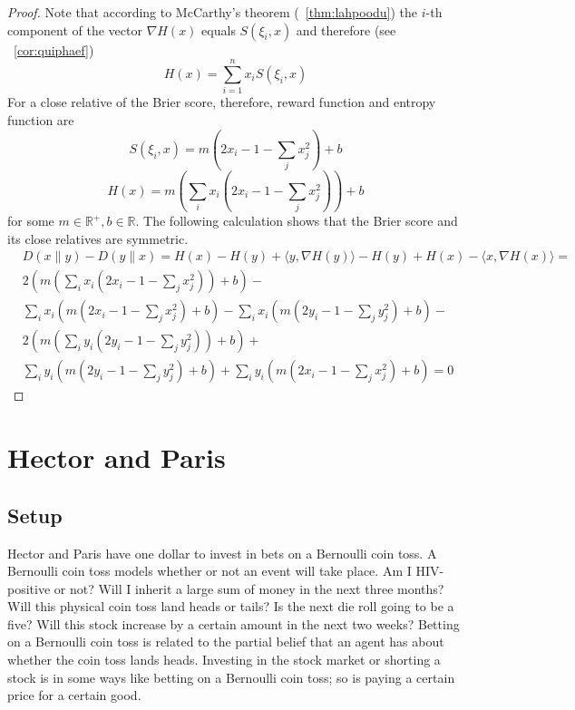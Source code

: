 \documentclass[12pt]{article}
\begin{document}
\begin{proof}
Note that according to McCarthy's theorem
({\heorem}~\ref{thm:lahpoodu}) the $i$-th component of the vector
$\nabla{}H(x)$ equals $S(\xi_{i},x)$ and therefore (see {\orollary}~\ref{cor:quiphaef})
\begin{equation}
  \label{eq:idiirioj}
  H(x)=\sum_{i=1}^{n}x_{i}S(\xi_{i},x)
\end{equation}
For a close relative of the Brier score, therefore, reward function
and entropy function are
\begin{equation}
  \label{eq:paegeina}
    S(\xi_{i},x)=m\left(2x_{i}-1-\sum_{j}x_{j}^{2}\right)+b
\end{equation}
\begin{equation}
  \label{eq:thughica}
    H(x)=m\left(\sum_{i}{}x_{i}\left(2x_{i}-1-\sum_{j}x_{j}^{2}\right)\right)+b
\end{equation}
for some $m\in\mathbb{R}^{+},b\in\mathbb{R}$. The following
calculation shows that the Brier score and its close relatives are
symmetric.
\begin{equation}
  \label{eq:uudeilah}
  \begin{split}
    & D(x\|y)-D(y\|x)=H(x)-H(y)+\langle{}y,\nabla{}H(y)\rangle-H(y)+H(x)-\langle{}x,\nabla{}H(x)\rangle= \\
    & 2\left(m\left(\sum_{i}{}x_{i}\left(2x_{i}-1-\sum_{j}x_{j}^{2}\right)\right)+b\right)- \\
    & \sum_{i}x_{i}\left(m\left(2x_{i}-1-\sum_{j}x_{j}^{2}\right)+b\right)-\sum_{i}x_{i}\left(m\left(2y_{i}-1-\sum_{j}y_{j}^{2}\right)+b\right)- \\
    & 2\left(m\left(\sum_{i}{}y_{i}\left(2y_{i}-1-\sum_{j}y_{j}^{2}\right)\right)+b\right)+ \\
    & \sum_{i}y_{i}\left(m\left(2y_{i}-1-\sum_{j}y_{j}^{2}\right)+b\right)+\sum_{i}y_{i}\left(m\left(2x_{i}-1-\sum_{j}x_{j}^{2}\right)+b\right)=0
  \end{split}
\end{equation}
\end{proof}

\section{Hector and Paris}
\label{section:shauboda}

\subsection{Setup}
\label{subsection:iewohgae}

Hector and Paris have one dollar to invest in bets on a Bernoulli coin
toss. A Bernoulli coin toss models whether or not an event will take
place. Am I HIV-positive or not? Will I inherit a large sum of money
in the next three months? Will this physical coin toss land heads or
tails? Is the next die roll going to be a five? Will this stock
increase by a certain amount in the next two weeks? Betting on a
Bernoulli coin toss is related to the partial belief that an agent has
about whether the coin toss lands heads. Investing in the stock market
or shorting a stock is in some ways like betting on a Bernoulli coin
toss; so is paying a certain price for a certain good. 
\end{document}
